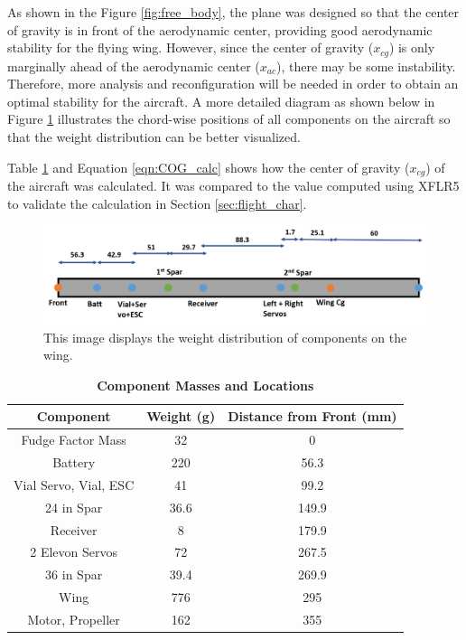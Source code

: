     As shown in the Figure \ref{fig:free_body}, the plane was designed so that the center of gravity is in front of the aerodynamic center, providing good aerodynamic stability for the flying wing. However, since the center of gravity ($x_{cg}$) is only marginally ahead of the aerodynamic center ($x_{ac}$), there may be some instability. Therefore, more analysis and reconfiguration will be needed in order to obtain an optimal stability for the aircraft. A more detailed diagram as shown below in Figure \ref{fig:weight_distribution} illustrates the chord-wise positions of all components on the aircraft so that the weight distribution can be better visualized. 
    
    Table \ref{tab:COG_calc} and Equation \ref{eqn:COG_calc} shows how the center of gravity ($x_{cg}$) of the aircraft was calculated. It was compared to the value computed using XFLR5 to validate the calculation in Section \ref{sec:flight_char}. 
    
    \begin{figure}[H]
        \centering
        \includegraphics[scale=0.52]{homeworks/homework4/report/Figure/components.png}
        \caption{This image displays the weight distribution of components on the wing.}
        \label{fig:weight_distribution}
    \end{figure}
    
    
    \begin{table}[H]
        \begin{center}
        \caption{\textbf{Component Masses and Locations}} \label{tab:COG_calc}
        \begin{tabular}{|c|c|c|}
        \hline
        \textbf{Component} & \textbf{Weight (g)} & \textbf{Distance from Front (mm)} \\ \hline
        Fudge Factor Mass & 32 & 0 \\ \hline
        Battery & 220 & 56.3  \\ \hline
        Vial Servo, Vial, ESC & 41 & 99.2 \\ \hline
        24 in Spar & 36.6  & 149.9 \\ \hline
        Receiver & 8 & 179.9 \\ \hline
        2 Elevon Servos & 72 & 267.5 \\ \hline
        36 in Spar & 39.4 & 269.9 \\ \hline
        Wing & 776 & 295 \\ \hline
        Motor, Propeller & 162 & 355 \\ \hline
        \end{tabular}
        \end{center}
    \end{table}
    
